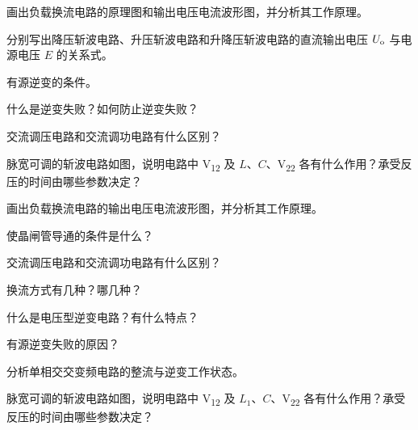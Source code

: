 \documentclass[电力电子]{subfiles}
\begin{document}
\begin{ti}[15 分]
	画出负载换流电路的原理图和输出电压电流波形图，并分析其工作原理。
\end{ti}

\begin{ti}[5 分]
	分别写出降压斩波电路、升压斩波电路和升降压斩波电路的直流输出电压 $U_{\mathrm{o}}$ 与电源电压 $E$ 的关系式。
\end{ti}

\begin{ti}[5 分]
	有源逆变的条件。
\end{ti}

\begin{ti}[5 分]
	什么是逆变失败？如何防止逆变失败？
\end{ti}

\begin{ti}[5 分]
	交流调压电路和交流调功电路有什么区别？
\end{ti}

\begin{ti}[10 分]
	脉宽可调的斩波电路如图，说明电路中 V\textsubscript{12} 及 $L$、$C$、V\textsubscript{22} 各有什么作用？\V 承受反压的时间由哪些参数决定？
\end{ti}

\begin{ti}[10 分]
	画出负载换流电路的输出电压电流波形图，并分析其工作原理。
\end{ti}

\begin{ti}[4 分]
	使晶闸管导通的条件是什么？
\end{ti}

\begin{ti}[4 分]
	交流调压电路和交流调功电路有什么区别？
\end{ti}

\begin{ti}[4 分]
	换流方式有几种？哪几种？
\end{ti}

\begin{ti}[4 分]
	什么是电压型逆变电路？有什么特点？
\end{ti}

\begin{ti}[4 分]
	有源逆变失败的原因？
\end{ti}

\begin{ti}[10 分]
	分析单相交交变频电路的整流与逆变工作状态。
\end{ti}

\begin{ti}[5 分]
	脉宽可调的斩波电路如图，说明电路中 V\textsubscript{12} 及 $L_{1}$、$C$、V\textsubscript{22} 各有什么作用？\V 承受反压的时间由哪些参数决定？
\end{ti}
\end{document}
